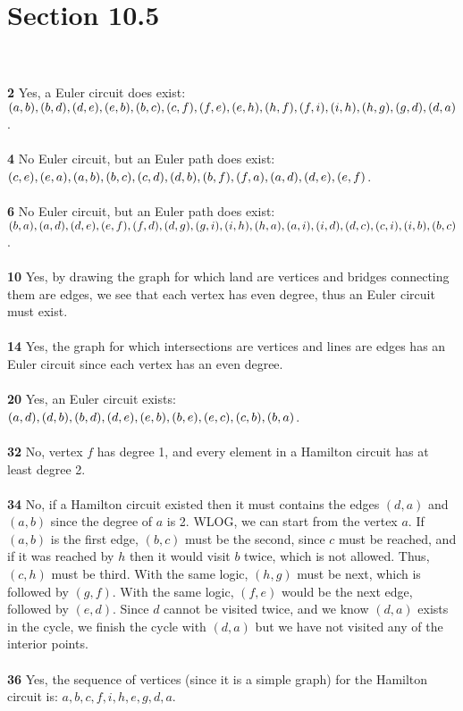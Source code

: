 \documentclass{article}
\begin{document}
\section*{Section 10.5}
\\\\\noindent\textbf{2} Yes, a Euler circuit does exist: $(a,b),(b,d),(d,e),(e,b),(b,c),(c,f),(f,e),(e,h),\\(h,f),(f,i),(i,h),(h,g),(g,d),(d,a)$.
\\\\\noindent\textbf{4} No Euler circuit, but an Euler path does exist: $(c,e),(e,a),(a,b),(b,c),(c,d),\\(d,b),(b,f),(f,a),(a,d),(d,e),(e,f)$.
\\\\\noindent\textbf{6} No Euler circuit, but an Euler path does exist: $(b,a),(a,d),(d,e),(e,f),(f,d),\\(d,g),(g,i),(i,h),(h,a),(a,i),(i,d),(d,c),(c,i),(i,b),(b,c)$.
\\\\\noindent\textbf{10} Yes, by drawing the graph for which land are vertices and bridges connecting them are edges, we see that each vertex has even degree, thus an Euler circuit must exist. 
\\\\\noindent\textbf{14} Yes, the graph for which intersections are vertices and lines are edges has an Euler circuit since each vertex has an even degree.
\\\\\noindent\textbf{20} Yes, an Euler circuit exists: $(a,d),(d,b),(b,d),(d,e),(e,b),(b,e),(e,c),(c,b),\\(b,a)$.
\\\\\noindent\textbf{32} No, vertex $f$ has degree 1, and every element in a Hamilton circuit has at least degree 2. 
\\\\\noindent\textbf{34} No, if a Hamilton circuit existed then it must contains the edges $(d,a)$ and $(a,b)$ since the degree of $a$ is 2. WLOG, we can start from the vertex $a$. If $(a,b)$ is the first edge, $(b,c)$ must be the second, since $c$ must be reached, and if it was reached by $h$ then it would visit $b$ twice, which is not allowed. Thus, $(c,h)$ must be third. With the same logic, $(h,g)$ must be next, which is followed by $(g,f)$. With the same logic, $(f,e)$ would be the next edge, followed by $(e,d)$. Since $d$ cannot be visited twice, and we know $(d,a)$ exists in the cycle, we finish the cycle with $(d,a)$ but we have not visited any of the interior points. 
\\\\\noindent\textbf{36} Yes, the sequence of vertices (since it is a simple graph) for the Hamilton circuit is: $a,b,c,f,i,h,e,g,d,a$. 
\end{document}
